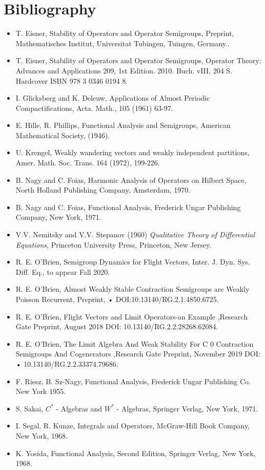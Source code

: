 \documentclass[req no]{amsart}[16pt]
\theoremstyle{plain}
\theoremstyle{definition}
\numberwithin{equation}{section}\setcounter{page}{1}
\begin{document}
\section{Bibliography}
\begin{itemize}

  \item [1] T. Eisner, Stability of Operators and Operator Semigroups, Preprint, Mathematisches Institut, Universitat Tubingen, Tuingen, Germany..
  \item [2] T. Eisner, Stability of Operators and Operator Semigroups, Operator Theory: Advances and Applications 209, 1st Edition. 2010. Buch. vIII, 204 S. Hardcover ISBN 978 3 0346 0194 8.
  \item[3] I. Glicksberg and K. Deleuw, Applications of Almost Periodic Compactifications, Acta. Math., 105 (1961) 63-97.
  \item[4] E. Hille, R. Phillips, Functional Analysis and Semigroups, American Mathematical Society, (1946).
  \item[5] U. Krengel, Weakly wandering vectors and weakly independent partitions, Amer. Math. Soc. Trans. 164 (1972), 199-226.
  \item[6] B. Nagy and C. Foias, Harmonic Analysis of Operators on Hilbert Space, North Holland Publishing Company, Amsterdam, 1970.
  \item[7] B. Nagy and C. Foias, Functional Analysis, Frederick Ungar Publishing Company, New York, 1971.
  \item[8] V.V. Nemitsky and V.V. Stepanov (1960) \emph{Qualitative Theory of Differential Equations}, Princeton University Press, Princeton, New Jersey.
  \item[9] R. E. O'Brien, Semigroup Dynamics for Flight Vectors, Inter. J. Dyn. Sys. Diff. Eq., to appear Fall 2020.
  \item[10] R. E. O'Brien, Almost Weakly Stable Contraction Semigroups are Weakly Poisson Recurrent, Preprint, •	DOI:10.13140/RG.2.1.4850.6725.
  \item[11] R. E. O'Brien, Flight Vectors and Limit Operators-an Example ,Research Gate Preprint, August 2018 DOI: 10.13140/RG.2.2.28268.62084.
  \item[12] R. E. O'Brien, The Limit Algebra And Weak Stability For C 0 Contraction Semigroups And Cogenerators ,Research Gate Preprint, November 2019 DOI: •	10.13140/RG.2.2.33374.79686.
  \item[13] F. Riesz, B. Sz-Nagy, Functional Analysis, Frederick Ungar Publishing Co. New York 1955.
  \item[14] S. Sakai, $C^{*}$ - Algebras and $W^{*}$ - Algebras, Springer Verlag, New York, 1971.
  \item[15] I. Segal, R. Kunze, Integrals and Operators, McGraw-Hill Book Company,  New York, 1968.
  \item[16] K. Yosida, Functional Analysis, Second Edition, Springer Verlag, New York, 1968.

\end{itemize}
\end{document}
